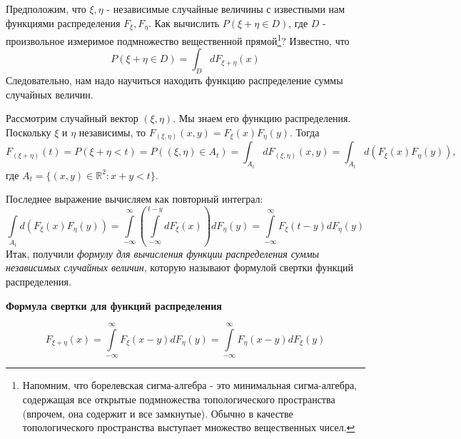 \begin{definition}
	Предположим, что $\xi, \eta$ - независимые случайные величины с известными нам функциями распределения $F_{\xi}, F_{\eta}$. Как вычислить $P(\xi + \eta \in D)$, где $D$ - произвольное измеримое подмножество вещественной прямой\footnote{Напомним, что борелевская сигма-алгебра - это минимальная сигма-алгебра, содержащая все открытые подмножества топологического пространства (впрочем, она содержит и все замкнутые). Обычно в качестве топологического пространства выступает множество вещественных чисел.}? Известно, что
	\[ P(\xi + \eta \in D) = \int_{D} d F_{\xi + \eta} (x) \]
	Следовательно, нам надо научиться находить функцию распределение суммы случайных величин.
	
	Рассмотрим случайный вектор $(\xi, \eta)$. Мы знаем его функцию распределения. Поскольку $\xi$ и $\eta$ независимы, то $F_{(\xi, \eta)} (x, y) = F_{\xi} (x) F_{\eta} (y)$. Тогда
	\[ F_{(\xi + \eta)} (t) = P(\xi + \eta < t) = P((\xi, \eta) \in A_t) = \int_{A_t} d F_{(\xi, \eta)} (x, y) = \int_{A_t} d (F_{\xi} (x) F_{\eta} (y)), \]
	где $A_t = \{ (x, y)\in \mathbb{R}^2 : x + y < t \}$.
	
	Последнее выражение вычисляем как повторный интеграл:
	\[ \int\limits_{A_t} d ( F_{\xi}(x) F_{\eta} (y) ) = \int\limits_{-\infty}^{\infty} \left( \int\limits_{-\infty}^{t-y} d F_{\xi} (x) \right) d F_{\eta} (y) = \int\limits_{-\infty}^{\infty} F_{\xi} (t - y) d F_{\eta} (y) \]
	Итак, получили\textit{ формулу для вычисления функции распределения суммы независимых случайных величин}, которую называют формулой свертки функций распределения.
	\begin{center}
		\textbf{Формула свертки для функций распределения}
	\end{center}
	\[ F_{\xi + \eta} (x) = \int\limits_{-\infty}^{\infty} F_{\xi} (x - y) d F_{\eta} (y) = \int\limits_{-\infty}^{\infty} F_{\eta} (x - y) d F_{\xi} (y) \]
\end{definition}
